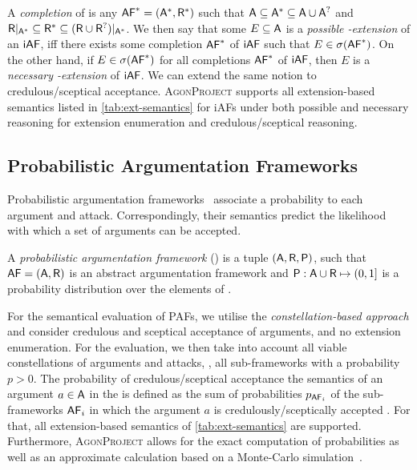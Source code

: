 \documentclass[
]{ceurart}
\newcommand{\agon}{\textsc{AgonProject}\xspace}
\begin{document}
A \emph{completion} of \iAF is any $\AF^* = (\arguments^*, \attacks^*)$ such that $\arguments \subseteq \arguments^* \subseteq \arguments \cup \arguments^?$ and $\attacks|_{\arguments^*} \subseteq \attacks^* \subseteq (\attacks \cup \attacks^?)|_{\arguments^*}$.
We then say that some $E\subseteq\arguments$ is a \emph{possible \sem-extension} of an $\mathsf{iAF}$, iff there exists some completion $\mathsf{AF}^*$ of $\mathsf{iAF}$ such that $E \in \sigma(\mathsf{AF}^*)$.
On the other hand, if $E \in \sigma(\mathsf{AF}^*)$ for all completions $\mathsf{AF}^*$ of $\mathsf{iAF}$, then $E$ is a \emph{necessary \sem-extension} of $\mathsf{iAF}$.
We can extend the same notion to credulous/sceptical acceptance.
\agon supports all extension-based semantics listed in \autoref{tab:ext-semantics} for iAFs under both possible and necessary reasoning for extension enumeration and credulous/sceptical reasoning.

\subsection{Probabilistic Argumentation Frameworks}

Probabilistic argumentation frameworks~\cite{DBLP:books/hofa/HunterPPRT21,DBLP:conf/tafa/LiON11} associate a probability to each argument and attack. Correspondingly, their semantics predict the likelihood with which a set of arguments can be accepted.

\begin{definition}\label{def:paf}
    A \emph{probabilistic argumentation framework} (\PAF) is a tuple $(\arguments, \attacks, \probdist)$, such that $\AF = (\arguments,\attacks)$ is an abstract argumentation framework and $\probdist : \arguments \cup \attacks \mapsto (0, 1]$ is a probability distribution over the elements of \AF.
\end{definition}

For the semantical evaluation of PAFs, we utilise the \emph{constellation-based approach} and consider credulous and sceptical acceptance of arguments, and no extension enumeration.
For the evaluation, we then take into account all viable constellations of arguments and attacks, \ie, all sub-frameworks with a probability $p > 0$.
The probability of credulous/sceptical acceptance \wrt the semantics \sem of an argument $a\in\arguments$ in the \PAF is defined as the sum of probabilities $p_{\mathsf{AF}_i}$ of the sub-frameworks $\mathsf{AF}_i$ in which the argument $a$ is credulously/sceptically accepted \wrt \sem.
For that, all extension-based semantics of \autoref{tab:ext-semantics} are supported.
Furthermore, \agon allows for the exact computation of probabilities as well as an approximate calculation based on a Monte-Carlo simulation~\cite{DBLP:conf/tafa/LiON11}.
\end{document}
